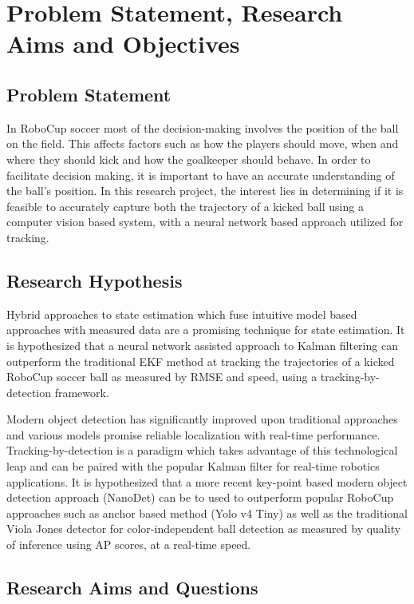 \documentclass[a4paper,twoside,12pt]{report}
\begin{document}
\chapter{Problem Statement, Research Aims and Objectives}
\section{Problem Statement}

In RoboCup soccer most of the decision-making involves the position of the ball on the field. This affects factors such as how the players should move, when and where they should kick and how the goalkeeper should behave. In order to facilitate decision making, it is important to have an accurate understanding of the ball’s position. In this research project, the interest lies in determining if it is feasible to accurately capture both the trajectory of a kicked ball using a computer vision based system, with a neural network based approach utilized for tracking.

\section{Research Hypothesis}

Hybrid approaches to state estimation which fuse intuitive model based approaches with measured data are a promising technique for state estimation. It is hypothesized that a neural network assisted approach to Kalman filtering can outperform the traditional EKF method at tracking the trajectories of a kicked RoboCup soccer ball as measured by RMSE and speed, using a tracking-by-detection framework.

Modern object detection has significantly improved upon traditional approaches and various models promise reliable localization with real-time performance. Tracking-by-detection is a paradigm which takes advantage of this technological leap and can be paired with the popular Kalman filter for real-time robotics applications. It is hypothesized that a more recent key-point based modern object detection approach (NanoDet) can be to used to outperform popular RoboCup approaches such as anchor based method (Yolo v4 Tiny) as well as the traditional Viola Jones detector for color-independent ball detection as measured by quality of inference using AP scores, at a real-time speed. 

\section{Research Aims and Questions}
\end{document}
